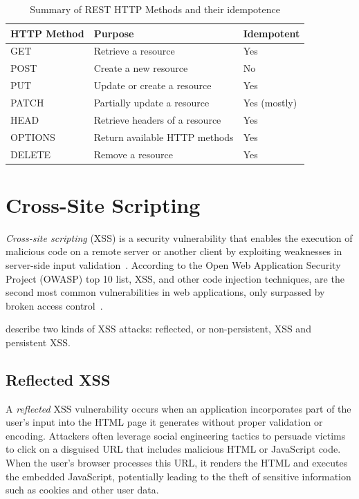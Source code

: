 \begin{table}[t]
    \centering
    \begin{tabular}{@{}lll@{}}
        \toprule
        \textbf{HTTP Method} & \textbf{Purpose}                         & \textbf{Idempotent} \\ \midrule
        GET                   & Retrieve a resource                     & Yes                 \\
        POST                  & Create a new resource                   & No                  \\
        PUT                   & Update or create a resource             & Yes                 \\
        PATCH                 & Partially update a resource             & Yes (mostly)        \\
        HEAD                  & Retrieve headers of a resource         & Yes                 \\
        OPTIONS               & Return available HTTP methods           & Yes                 \\
        DELETE                & Remove a resource                       & Yes                 \\ \bottomrule
    \end{tabular}
    \caption[List of HTTP Methods]{Summary of REST HTTP Methods and their idempotence \cite[chapter 9]{fielding_http_2022}}
    \label{tab:rest_http_methods}
\end{table}

\section{Cross-Site Scripting}
\label{sec:xss}
\textit{Cross-site scripting} (XSS) is a security vulnerability that enables the execution of malicious code on a remote server or
another client by exploiting weaknesses in server-side input validation~\cite{bisht_xss-guard_2008}.
According to the Open Web Application Security Project (OWASP) top 10 list, XSS, and other code injection techniques, are the second most common vulnerabilities in web applications, only surpassed by broken access control~\cite{noauthor_owasp_2025}.

\citet{kieyzun_automatic_2009} describe two kinds of XSS attacks: reflected, or non-persistent, XSS and persistent XSS.
\subsection{Reflected XSS}
A \textit{reflected} XSS vulnerability occurs when an application incorporates part of the user’s input into the HTML page it generates without proper validation or encoding. Attackers often leverage social engineering tactics to persuade victims to click on a disguised URL that includes malicious HTML or JavaScript code. When the user's browser processes this URL, it renders the HTML and executes the embedded JavaScript, potentially leading to the theft of sensitive information such as cookies and other user data.

